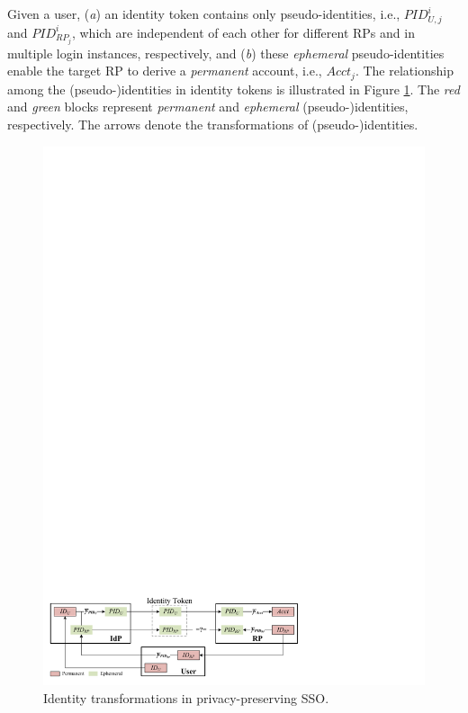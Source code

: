 Given a user,
    (\emph{a}) an identity token contains only pseudo-identities, i.e., $PID_{U,j}^i$ and $PID_{RP_j}^i$,
        which are independent of each other for different RPs and in multiple login instances, respectively,
    and (\emph{b}) these \emph{ephemeral} pseudo-identities enable the target RP to derive a \emph{permanent} account, i.e., $Acct_j$.
The relationship among the (pseudo-)identities in identity tokens is illustrated in Figure \ref{fig:IDCorrelation}.
The \emph{red} and \emph{green} blocks represent \emph{permanent} and \emph{ephemeral} (pseudo-)identities, respectively.
The arrows denote the transformations of (pseudo-)identities.


\begin{figure}[bt]
  \centering
  \includegraphics[width=0.98\linewidth]{fig/IDCorrelation.pdf}
  \caption{Identity transformations in privacy-preserving SSO.}
  \label{fig:IDCorrelation}
\end{figure}

